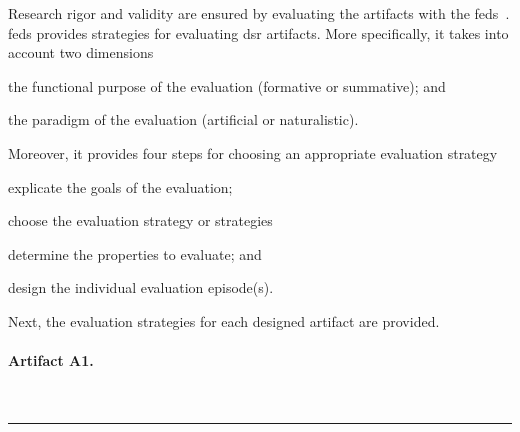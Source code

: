 \documentclass[a4paper,11pt]{article}
\begin{document}
Research rigor and validity are ensured by evaluating the artifacts with the \gls{feds}~\cite{Venable2016}. \Gls{feds} provides strategies for evaluating \gls{dsr} artifacts. More specifically, it takes into account two dimensions
\begin{inparaenum}[\itshape i)]
	\item the functional purpose of the
	evaluation (formative or summative); and 
	\item the paradigm of the evaluation (artificial or naturalistic).
\end{inparaenum} 
Moreover, it provides four steps for choosing an appropriate evaluation strategy
\begin{inparaenum}[\itshape i)]
	\item explicate the goals of the evaluation;
	\item choose the evaluation strategy or strategies
	\item determine the properties to evaluate; and
	\item design the individual evaluation episode(s). 
\end{inparaenum} 

Next, the evaluation strategies for each designed artifact are provided.


%

\paragraph{Artifact A1.} 
~\\\noindent\rule[1ex]{2.5cm}{2pt}~\\	
\end{document}

